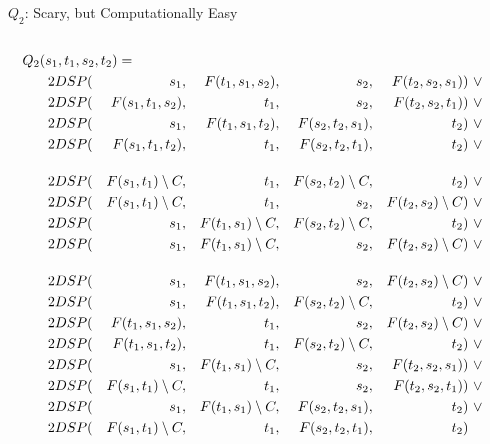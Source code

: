 \documentclass{beamer}
\newcommand{\sm}{\setminus}
\begin{document}
\begin{frame}{$Q_2$: Scary, but Computationally Easy}
\begin{columns}
\begin{column}{0.65\textwidth}
\tiny
\begin{align}
Q_2(s_1, t_1, s_2, t_2) =\hspace{-1cm}\\
    2DSP(&& s_1              ,&& F(t_1, s_1, s_2) ,&& s_2              ,&& F(t_2, s_2, s_1) &)~\vee \\
    2DSP(&& F(s_1, t_1, s_2) ,&& t_1              ,&& s_2              ,&& F(t_2, s_2, t_1) &)~\vee \\
    2DSP(&& s_1              ,&& F(t_1, s_1, t_2) ,&& F(s_2, t_2, s_1) ,&& t_2              &)~\vee \\
    2DSP(&& F(s_1, t_1, t_2) ,&& t_1              ,&& F(s_2, t_2, t_1) ,&& t_2              &)~\vee \\[0.4cm]
    2DSP(&& F(s_1, t_1) \sm C,&& t_1              ,&& F(s_2, t_2) \sm C,&& t_2              &)~\vee \\ 
    2DSP(&& F(s_1, t_1) \sm C,&& t_1              ,&& s_2              ,&& F(t_2, s_2) \sm C&)~\vee \\ 
    2DSP(&& s_1              ,&& F(t_1, s_1) \sm C,&& F(s_2, t_2) \sm C,&& t_2              &)~\vee \\ 
    2DSP(&& s_1              ,&& F(t_1, s_1) \sm C,&& s_2              ,&& F(t_2, s_2) \sm C&)~\vee \\[0.4cm]
    2DSP(&& s_1              ,&& F(t_1, s_1, s_2) ,&& s_2              ,&& F(t_2, s_2) \sm C&)~\vee \\
    2DSP(&& s_1              ,&& F(t_1, s_1, t_2) ,&& F(s_2, t_2) \sm C,&& t_2              &)~\vee \\
    2DSP(&& F(t_1, s_1, s_2) ,&& t_1              ,&& s_2              ,&& F(t_2, s_2) \sm C&)~\vee \\
    2DSP(&& F(t_1, s_1, t_2) ,&& t_1              ,&& F(s_2, t_2) \sm C,&& t_2              &)~\vee \\
    2DSP(&& s_1              ,&& F(t_1, s_1) \sm C,&& s_2              ,&& F(t_2, s_2, s_1) &)~\vee \\
    2DSP(&& F(s_1, t_1) \sm C,&& t_1              ,&& s_2              ,&& F(t_2, s_2, t_1) &)~\vee \\
    2DSP(&& s_1              ,&& F(t_1, s_1) \sm C,&& F(s_2, t_2, s_1) ,&& t_2              &)~\vee \\
    2DSP(&& F(s_1, t_1) \sm C,&& t_1              ,&& F(s_2, t_2, t_1) ,&& t_2              &) \label{eq:Q2}

\end{align}
\end{column}
\end{columns}
\end{frame}
\end{document}
